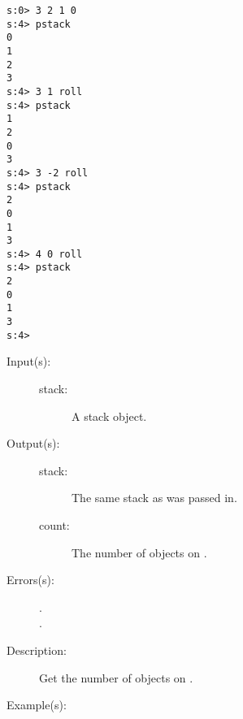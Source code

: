 \begin{description}
\begin{description}
\begin{verbatim}
s:0> 3 2 1 0 
s:4> pstack
0
1
2
3
s:4> 3 1 roll
s:4> pstack
1
2
0
3
s:4> 3 -2 roll
s:4> pstack
2
0
1
3
s:4> 4 0 roll
s:4> pstack
2
0
1
3
s:4>
		\end{verbatim}
	\end{description}
\label{systemdict:scount}
\item[{\onyxop{stack}{scount}{stack count}}: ]
	\begin{description}\item[]
	\item[Input(s): ]
		\begin{description}\item[]
		\item[stack: ]
			A stack object.
		\end{description}
	\item[Output(s): ]
		\begin{description}\item[]
		\item[stack: ]
			The same stack as was passed in.
		\item[count: ]
			The number of objects on .
		\end{description}
	\item[Errors(s): ]
		\begin{description}\item[]
		\item[.]
		\item[.]
		\end{description}
	\item[Description: ]
		Get the number of objects on .
	\item[Example(s): ]\begin{verbatim}


\end{verbatim}
\end{description}
\end{description}
